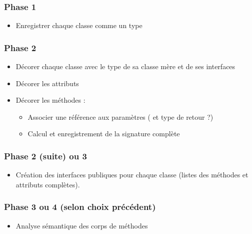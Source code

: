 \documentclass{../../res/univ-projet}
\begin{document}
  \subsubsection{Phase 1}
  \begin{itemize}
    \item Enregistrer chaque classe comme un type
  \end{itemize}
  \subsubsection{Phase 2}
  \begin{itemize}
    \item Décorer chaque classe avec le type de sa classe mère et de ses interfaces
    \item Décorer les attributs
    \item Décorer les méthodes :
      \begin{itemize}
        \item Associer une référence aux paramètres ( et type de retour ?)
        \item Calcul et enregistrement de la signature complète
      \end{itemize}
    
  \end{itemize}
  \subsubsection{Phase 2 (suite) ou 3}
  \begin{itemize}
    \item Création des interfaces publiques pour chaque classe (listes des méthodes et attributs
  complètes).
  \end{itemize}
  \subsubsection{Phase 3 ou 4 (selon choix précédent)}
  \begin{itemize}
    \item Analyse sémantique des corps de méthodes
  \end{itemize}
\end{document}
